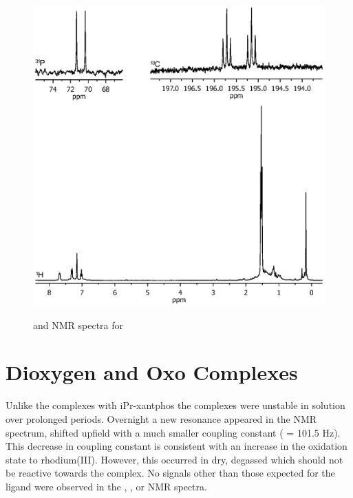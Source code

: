 \begin{figure}[htb]
\begin{center}
\vspace{0.5cm}
\includegraphics[trim = 2.5cm 7.2cm 2.5cm 5.0cm, clip]{../NMR/7017.eps}
\caption[\phosphorus{} and \proton{} NMR spectra for [Rh(\tBuxantphos)Cl{]}(CO)2]{\phosphorus{} and \proton{} NMR spectra for \ce{[Rh(\tBuxantphos)Cl(CO)2]}}
\vspace{0.2cm}
\label{Rhcarbonylnmr}
\end{center}
\end{figure}
\vspace{0.2cm}

\section{Dioxygen and Oxo Complexes}

Unlike the complexes with iPr-xantphos the complexes  were unstable in solution over prolonged periods.  Overnight a new resonance appeared in the \phosphorus NMR spectrum, shifted upfield with a much smaller coupling constant (\JRhP{} = 101.5 Hz).  This decrease in coupling constant is consistent with an increase in the oxidation state to rhodium(III).  However, this occurred in dry, degassed which should not be reactive towards the complex.  No signals other than those expected for the ligand were observed in the \proton, \carbon, or \phosphorus{} NMR spectra.  

